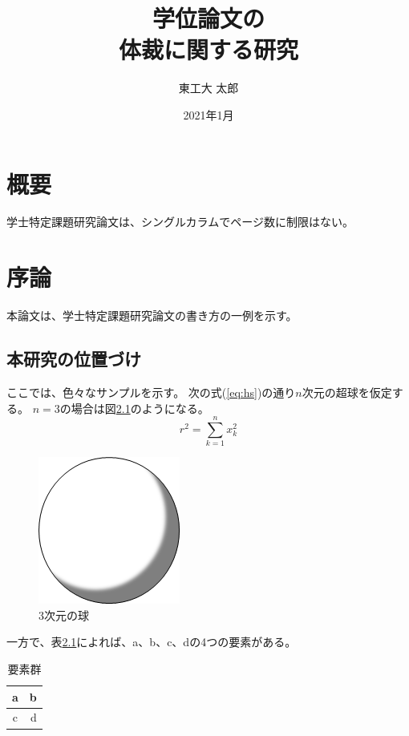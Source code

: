 \documentclass[11pt,oneside,openany,report]{jsbook}
\title{学位論文の\\体裁に関する研究}
\author{東工大 太郎}
\affiliation{東京工業大学\\情報理工学院\\情報工学系}
\date{2021年1月}
\begin{document}
\frontmatter
\maketitle

\chapter{概要}
学士特定課題研究論文は、シングルカラムでページ数に制限はない。

\tableofcontents
\listoffigures
\listoftables


\mainmatter
\chapter{序論}
本論文は、学士特定課題研究論文の書き方\cite{tokodai-xyz2015}の一例を示す。

\section{本研究の位置づけ}
ここでは、色々なサンプルを示す。
次の式(\ref{eq:hs})の通り$n$次元の超球を仮定する。
$n=3$の場合は図\ref{fig:hs}のようになる。
\begin{equation}
  r^2 = \sum_{k=1}^{n} x_k^2 \label{eq:hs}
\end{equation}
\begin{figure}[tb]
  \centering
  \includegraphics[scale=1.0]{fig/sample.png}
  \caption{3次元の球}\label{fig:hs}
\end{figure}

一方で、表\ref{tab:sample}によれば、a、b、c、dの4つの要素がある。
\begin{table}[tb]
  \centering
  \caption{要素群}\label{tab:sample}
  \begin{tabular}{|c|r|}
    \hline
    a & b \\ \hline
    c & d \\ \hline
  \end{tabular}
\end{table}
\end{document}
